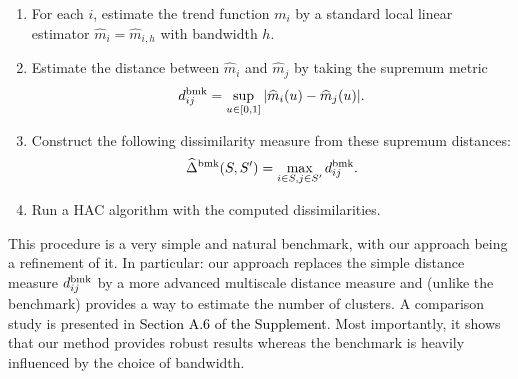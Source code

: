 \documentclass[a4paper,12pt]{article}
\newcommand{\reference}[1]{\textcolor{black}{#1}}
\begin{document}
\begin{enumerate}[label=\arabic*.,leftmargin=0.6cm]
\begin{enumerate}[label=\textit{Step \arabic*}.,leftmargin=1.5cm,itemsep=0pt,parsep=0pt,topsep=3pt]
\item For each $i$, estimate the trend function $m_i$ by a standard local linear estimator $\widehat{m}_i = \widehat{m}_{i,h}$ with bandwidth $h$.
\item Estimate the distance between $\widehat{m}_i$ and $\widehat{m}_j$ by taking the supremum metric 
\[ d_{ij}^{\textnormal{bmk}} = \sup_{u \in [0,1]} |\widehat{m}_i(u) - \widehat{m}_j(u)|. \]
\item Construct the following dissimilarity measure from these supremum distances:
\[ \widehat{\Delta}^{\textnormal{bmk}}(S,S') = \max_{i \in S,j \in S'} d_{ij}^{\textnormal{bmk}}. \]
\item Run a HAC algorithm with the computed dissimilarities. 
\end{enumerate}
%
%
This procedure is a very simple and natural benchmark, with our approach being a refinement of it. In particular: our approach replaces the simple distance measure $d_{ij}^{\textnormal{bmk}}$ by a more advanced multiscale distance measure and (unlike the benchmark) provides a way to estimate the number of clusters. A comparison study is presented in \reference{Section A.6 of the Supplement}. Most importantly, it shows that our method provides robust results whereas the benchmark is heavily influenced by the choice of bandwidth.  


\end{enumerate}
\end{document}
